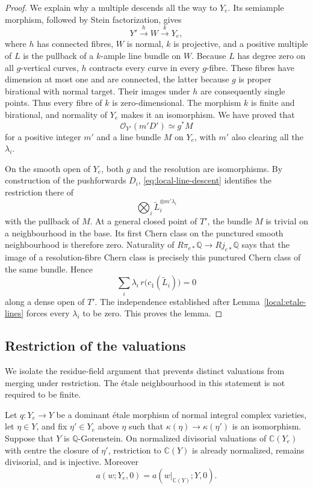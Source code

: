 \begin{proof}
We explain why a multiple descends all the way to $Y_e$.  Its
semiample morphism, followed by Stein factorization, gives
\[
 Y'\xrightarrow{h} W\xrightarrow{k}Y_e,
\]
where $h$ has connected fibres, $W$ is normal, $k$ is projective,
and a positive multiple of $L$ is the pullback of a $k$-ample line
bundle on $W$.  Because $L$ has degree zero on all $g$-vertical
curves, $h$ contracts every curve in every $g$-fibre.  These fibres
have dimension at most one and are connected, the latter because
$g$ is proper birational with normal target.  Their images under
$h$ are consequently single points.  Thus every fibre of $k$ is
zero-dimensional.  The morphism $k$ is finite and birational, and
normality of $Y_e$ makes it an isomorphism.  We have proved that
\begin{equation}\label{eq:local-line-descent}
 \mathcal O_{Y'}(m'D')\simeq g^*M
\end{equation}
for a positive integer $m'$ and a line bundle $M$ on $Y_e$, with
$m'$ also clearing all the $\lambda_i$.

On the smooth open of $Y_e$, both $g$ and the resolution are
isomorphisms.  By construction of the pushforwards $D_i$,
\eqref{eq:local-line-descent} identifies the restriction there of
\[
 \bigotimes_i\widetilde L_i^{\otimes m'\lambda_i}
\]
with the pullback of $M$.  At a general closed point of $T'$, the
bundle $M$ is trivial on a neighbourhood in the base.  Its first
Chern class on the punctured smooth neighbourhood is therefore zero.
Naturality of
$R\pi_{e*}\mathbb Q\to Rj_{e*}\mathbb Q$ says that the image of a
resolution-fibre Chern class is precisely this punctured Chern class
of the same bundle.  Hence
\[
 \sum_i\lambda_i\,r\bigl(c_1(\widetilde L_i)\bigr)=0
\]
along a dense open of $T'$.  The independence established after
Lemma~\ref{local:etale-lines} forces every $\lambda_i$ to be zero.
This proves the lemma.
\end{proof}

\subsection{Restriction of the valuations}

We isolate the residue-field argument that prevents distinct
valuations from merging under restriction.  The \'etale
neighbourhood in this statement is not required to be finite.

\begin{lemma}\label{local:restriction-injective}
Let $q:Y_e\to Y$ be a dominant \'etale morphism of
normal integral complex varieties, let $\eta\in Y$, and fix
$\eta'\in Y_e$ above $\eta$ such that
$\kappa(\eta)\to\kappa(\eta')$ is an isomorphism.  Suppose that $Y$
is $\mathbb Q$-Gorenstein.  On normalized divisorial valuations of
$\mathbb C(Y_e)$ with centre the closure of $\eta'$, restriction to
$\mathbb C(Y)$ is already normalized, remains divisorial, and is
injective.  Moreover
\[
 a(w;Y_e,0)=a(w|_{\mathbb C(Y)};Y,0).
\]
\end{lemma}


